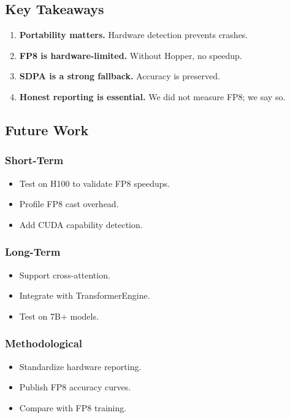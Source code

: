\subsection{Key Takeaways}

\begin{enumerate}
\item \textbf{Portability matters.} Hardware detection prevents crashes.
\item \textbf{FP8 is hardware-limited.} Without Hopper, no speedup.
\item \textbf{SDPA is a strong fallback.} Accuracy is preserved.
\item \textbf{Honest reporting is essential.} We did not measure FP8; we say so.

\end{enumerate}
\subsection{Future Work}

\subsubsection{Short-Term}

\begin{itemize}
\item Test on H100 to validate FP8 speedups.
\item Profile FP8 cast overhead.
\item Add CUDA capability detection.

\end{itemize}
\subsubsection{Long-Term}

\begin{itemize}
\item Support cross-attention.
\item Integrate with TransformerEngine.
\item Test on 7B+ models.

\end{itemize}
\subsubsection{Methodological}

\begin{itemize}
\item Standardize hardware reporting.
\item Publish FP8 accuracy curves.
\item Compare with FP8 training.

\end{itemize}
